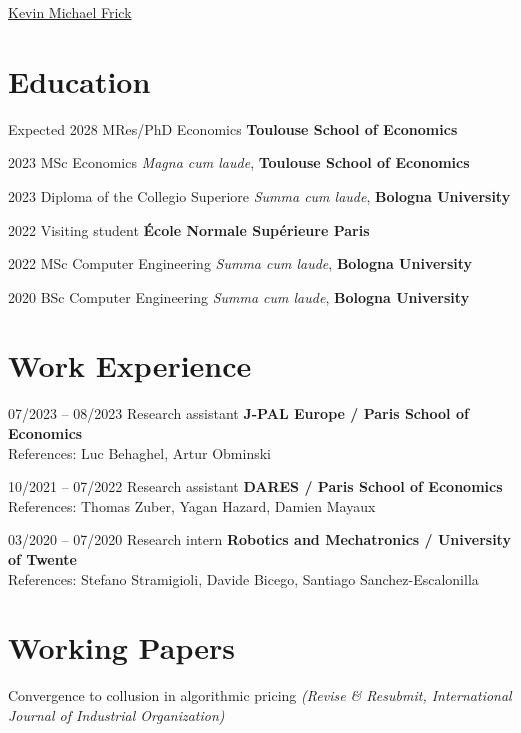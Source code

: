 \documentclass[11pt,a4paper]{article}
\newcommand{\longunderline}[1]{\uline{#1\hfill\mbox{}}}
\begin{document}
\date{}
\thispagestyle{empty}
\setlength\cvlabelwidth{90pt}

\begin{cv}
{\huge \longunderline{Kevin Michael Frick}}
\section*{Education}
\begin{cvlist}{}
  \itemsep -5pt

	\item[Expected 2028] MRes/PhD Economics \hfill \textbf{Toulouse School of Economics} 
        \item[2023] MSc Economics \hfill \emph{Magna cum laude},  \textbf{Toulouse School of Economics}  
    \item[2023] Diploma of the Collegio Superiore \hfill \emph{Summa cum laude},  \textbf{Bologna University}
    \item[2022] Visiting student \hfill \textbf{École Normale Supérieure Paris}  
    \item[2022] MSc Computer Engineering \hfill \emph{Summa cum laude},  \textbf{Bologna University}
    \item[2020] BSc Computer Engineering \hfill \emph{Summa cum laude},  \textbf{Bologna University}
    \end{cvlist}

\section*{Work Experience}
\begin{cvlist}{}
  \itemsep -5pt
	\item[07/2023 -- 08/2023]
		Research assistant \hfill \textbf{J-PAL Europe / Paris School of Economics} \\
		References: Luc Behaghel, Artur Obminski
	\item[10/2021 -- 07/2022]
    Research assistant \hfill \textbf{DARES / Paris School of Economics} \\
		References: Thomas Zuber, Yagan Hazard, Damien Mayaux
	\item[03/2020 -- 07/2020]
		Research intern \hfill \textbf{Robotics and Mechatronics / University of Twente} \\
		References: Stefano Stramigioli, Davide Bicego, Santiago Sanchez-Escalonilla
\end{cvlist}

\section*{Working Papers}
 Convergence to collusion in algorithmic pricing \emph{(Revise \& Resubmit, International Journal of Industrial Organization)}
 

\end{cv}
\end{document}
